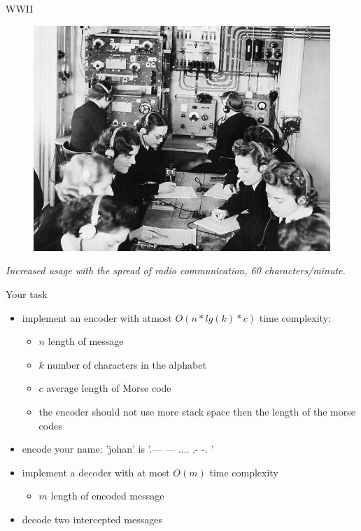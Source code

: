 \begin{frame}{WWII}

  \begin{figure}
    \center
    \includegraphics[scale=0.4]{women.png}

  \end{figure}

  \vspace{10pt}\pause  
  {\em Increased usage with the spread of radio communication, 60 characters/minute.}

\end{frame}


\begin{frame}{Your task}

  \begin{itemize}
  \item implement an encoder with atmost $O(n*lg(k)*c)$ time complexity:
    \begin{itemize}
     \item $n$ length of message
     \item $k$ number of characters in the alphabet
     \item $c$ average length of Morse code
     \item the encoder should not use more stack space then the length of the morse codes
     \end{itemize}

   \item encode your name: 'johan'  is '.--- --- .... .- -. '
   \item implement a decoder with at most $O(m)$ time complexity
     \begin{itemize}
     \item $m$ length of encoded message
     \end{itemize}
     \item decode two intercepted messages
   \end{itemize}
  
\end{frame}






